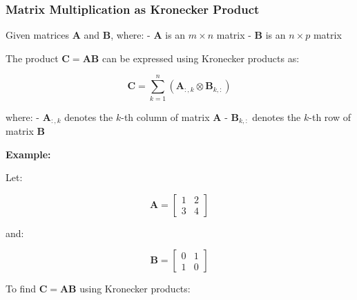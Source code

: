 \documentclass[
  letterpaper,
  DIV=11,
  numbers=noendperiod]{scrreprt}
\theoremstyle{plain}
\theoremstyle{definition}
\theoremstyle{remark}
\begin{document}
\subsubsection{Matrix Multiplication as Kronecker
Product}\label{matrix-multiplication-as-kronecker-product}

Given matrices \(\mathbf{A}\) and \(\mathbf{B}\), where: -
\(\mathbf{A}\) is an \(m \times n\) matrix - \(\mathbf{B}\) is an
\(n \times p\) matrix

The product \(\mathbf{C} = \mathbf{A} \mathbf{B}\) can be expressed
using Kronecker products as:

\[
\mathbf{C} = \sum_{k=1}^n (\mathbf{A}_{:,k} \otimes \mathbf{B}_{k,:})
\]

where: - \(\mathbf{A}_{:,k}\) denotes the \(k\)-th column of matrix
\(\mathbf{A}\) - \(\mathbf{B}_{k,:}\) denotes the \(k\)-th row of matrix
\(\mathbf{B}\)

\textbf{Example:}

Let:

\[
\mathbf{A} = \begin{bmatrix}
1 & 2 \\
3 & 4
\end{bmatrix}
\]

and:

\[
\mathbf{B} = \begin{bmatrix}
0 & 1 \\
1 & 0
\end{bmatrix}
\]

To find \(\mathbf{C} = \mathbf{A} \mathbf{B}\) using Kronecker products:
\end{document}
